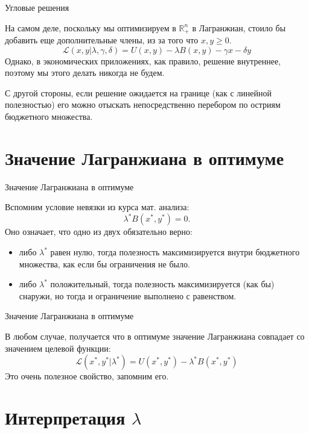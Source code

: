 \documentclass{beamer}
\begin{document}
\begin{frame}{Угловые решения}

На самом деле, поскольку мы оптимизируем в $\mathbb{R}^n_{+}$ в Лагранжиан, стоило бы добавить еще дополнительные члены, из за того что $x,y \geqslant 0$. 
$$ \mathcal{L}(x,y | \lambda, \gamma, \delta) = U(x,y) - \lambda B(x,y) - \gamma x - \delta y$$
Однако, в экономических приложениях, как правило, решение внутреннее, поэтому мы этого делать никогда не будем.

С другой стороны, \alert{если решение ожидается на границе} (как с линейной полезностью) \alert{его можно отыскать непосредственно перебором по остриям бюджетного множества}.

\end{frame}

\section{Значение Лагранжиана в оптимуме}

\begin{frame}{Значение Лагранжиана в оптимуме}

Вспомним условие невязки из курса мат. анализа:
$$ \lambda^{\ast} B(x^{\ast},y^{\ast}) = 0.$$
Оно означает, что одно из двух обязательно верно: 

\begin{itemize}
  \item либо $\lambda^{\ast}$ равен нулю, тогда полезность максимизируется внутри бюджетного множества, как если бы ограничения не было.
  \item либо $\lambda^{\ast}$ положительный, тогда полезность максимизируется (как бы) снаружи,  но тогда и ограничение выполнено с равенством.
\end{itemize}
 

\end{frame}

\begin{frame}{Значение Лагранжиана в оптимуме}

В любом случае, получается что \alert{в оптимуме значение Лагранжиана совпадает со значением целевой функции}:
$$ \mathcal{L}(x^{\ast}, y^{\ast} | \lambda^{\ast}) = U(x^{\ast}, y^{\ast}) - \lambda^{\ast} B(x^{\ast}, y^{\ast})$$ 
Это очень полезное свойство, запомним его.

\end{frame}

\section{Интерпретация $\lambda$}
\end{document}
